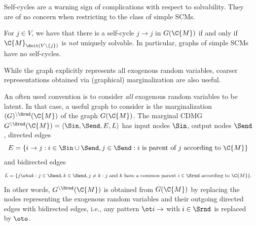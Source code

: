 Self-cycles are a warning sign of complications with respect to solvability.
They are of no concern when restricting to the class of simple SCMs.
\begin{Prp}
  For $j \in V$, we have that there is a self-cycle $j \to j$ in $G(\C{M})$ if and only if
  $\C{M}_{\doit(V\setminus \{j\})}$ is \emph{not} uniquely solvable. 
  In particular, graphs of simple SCMs have no self-cycles.
\end{Prp}

While the graph explicitly represents all exogenous random variables, coarser
representations obtained via (graphical) marginalization are also useful.
\begin{Rem}
  An often used convention is to consider \emph{all} exogenous random variables to be latent. 
  In that case, a useful graph
  to consider is the marginalization $(G)^{\setminus \Srnd}(\C{M})$ of the graph $G(\C{M})$. 
  The marginal CDMG $G^{\setminus \Srnd}(\C{M}) = \langle \Sin, \Send, E, L \rangle$ has
  input nodes $\Sin$, output nodes $\Send$, directed edges
  $$E = \{i \to j : i \in \Sin\cup\Send, j\in\Send: \text{$i$ is parent of $j$ according to $\C{M}$}\}$$
  and bidirected edges
  $$L = \{j \oto k : j \in \Send, k \in \Send, j \ne k: \text{$j$ and $k$ have a common parent $i\in\Srnd$ according to $\C{M}$}\}.$$
  In other words, $G^{\setminus \Srnd}(\C{M})$ is obtained from $G(\C{M})$ by replacing the nodes representing the exogenous random
  variables and their outgoing directed edges with bidirected edges, i.e.,
  any pattern $\ot i \to$ with $i \in \Srnd$ is replaced by $\oto$.
\end{Rem}

